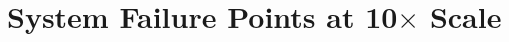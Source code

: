 \documentclass[11pt,a4paper]{article}
\begin{document}


\section{System Failure Points at \texorpdfstring{10$\times$}{10x} Scale}
\label{sec:scale_breakdown}
\end{document}
